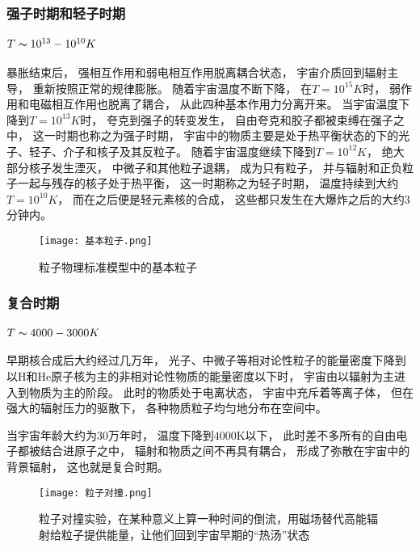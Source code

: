 \documentclass[8pt]{beamer}
\begin{document}
        \begin{frame}[fragile]
            \frametitle{强子时期和轻子时期}
            \framesubtitle{$T\thicksim 10^{13}-10^{10}K$}
            \begin{multicols}{2} 
                \qquad
                暴胀结束后，
                强相互作用和弱电相互作用脱离耦合状态，
                宇宙介质回到辐射主导，
                重新按照正常的规律膨胀。
                随着宇宙温度不断下降，
                在$T=10^{15}K$时，
                弱作用和电磁相互作用也脱离了耦合，
                从此四种基本作用力分离开来。
                当宇宙温度下降到$T=10^{13}K$时，
                夸克到强子的转变发生，
                自由夸克和胶子都被束缚在强子之中，
                这一时期也称之为强子时期，
                宇宙中的物质主要是处于热平衡状态的下的光子、轻子、介子和核子及其反粒子。
                随着宇宙温度继续下降到$T=10^{12}K$，
                绝大部分核子发生湮灭，
                中微子和其他粒子退耦，
                成为只有粒子，
                并与辐射和正负粒子一起与残存的核子处于热平衡，
                这一时期称之为轻子时期，
                温度持续到大约$T=10^{10}K$，
                而在之后便是轻元素核的合成，
                这些都只发生在大爆炸之后的大约3分钟内。
                \begin{figure}[h]
                    \centering
                    \texttt{[image: 基本粒子.png]}  
                    \caption{粒子物理标准模型中的基本粒子}
                \end{figure}
            \end{multicols}
        \end{frame}


        \begin{frame}[fragile]
            \frametitle{复合时期}
            \framesubtitle{$T\thicksim 4000-3000K$}
            \begin{multicols}{2} 
                \qquad
                早期核合成后大约经过几万年，
                光子、中微子等相对论性粒子的能量密度下降到以H和He原子核为主的非相对论性物质的能量密度以下时，
                宇宙由以辐射为主进入到物质为主的阶段。
                此时的物质处于电离状态，
                宇宙中充斥着等离子体，
                但在强大的辐射压力的驱散下，
                各种物质粒子均匀地分布在空间中。

                \qquad
                当宇宙年龄大约为30万年时，
                温度下降到4000K以下，
                此时差不多所有的自由电子都被结合进原子之中，
                辐射和物质之间不再具有耦合，
                形成了弥散在宇宙中的背景辐射，
                这也就是复合时期。

                \begin{figure}[h]
                    \centering
                    \texttt{[image: 粒子对撞.png]}  
                    \caption{粒子对撞实验，在某种意义上算一种时间的倒流，用磁场替代高能辐射给粒子提供能量，让他们回到宇宙早期的“热汤”状态}
                \end{figure}
            \end{multicols}
        \end{frame}
        
\end{document}
